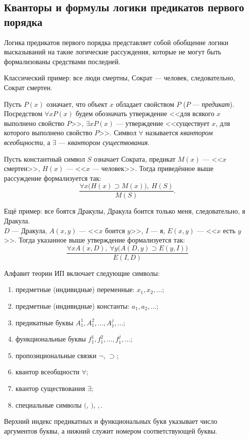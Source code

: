\subsection{Кванторы и формулы логики предикатов первого порядка}
Логика предикатов первого порядка представляет собой обобщение логики высказываний на такие логические рассуждения, которые не могут быть формализованы средствами последней.

Классический пример: все люди смертны, Сократ --- человек, следовательно, Сократ смертен.

Пусть $P(x)$ означает, что объект $x$ обладает свойством $P$ ($P$ --- \textit{предикат}). Посредством $\forall xP(x)$ будем обозначать утверждение <<для всякого $x$ выполнено свойство $P$>>, $\exists xP(x)$ --- утверждение <<существует $x$, для которого выполнено свойство $P$>>. Символ $\forall$ называется \textit{квантором всеобщности}, а $\exists$ --- \textit{квантором существования}.

Пусть константный символ $S$ означает Сократа, предикат $M(x)$ --- <<$x$ смертен>>, $H(x)$ --- <<$x$ --- человек>>. Тогда приведённое выше рассуждение формализуется так:
\[
    \frac{\forall x\big(H(x) \supset M(x)\big),\ H(S)}{M(S)}.
\]

Ещё пример: все боятся Дракулы, Дракула боится только меня, следовательно, я Дракула. \\
$D$ --- Дракула, $A(x, y)$ --- <<$x$ боится $y$>>, $I$ --- я, $E(x, y)$ --- <<$x$ есть $y$>>. Тогда указанное выше утверждение формализуется так:
\[
    \frac{\forall xA(x, D),\ \forall y\big(A(D, y) \supset E(y, I)\big)}{E(I, D)}
\]

Алфавит теории ИП включает следующие символы:
\begin{enumerate}
    \item предметные (индивидные) переменные: $x_1, x_2, \dots$;
    \item предметные (индивидные) константы: $a_1, a_2, \dots$;
    \item предикатные буквы $A_1^1, A_1^2, \dots, A_1^j, \dots$;
    \item функциональные буквы $f_1^1, f_1^2, \dots, f_1^j, \dots$;
    \item пропозициональные связки $\neg$, $\supset$;
    \item квантор всеобщности $\forall$;
    \item квантор существования $\exists$;
    \item специальные символы $($, $)$, $,$.
\end{enumerate}
Верхний индекс предикатных и функциональных букв указывает число аргументов буквы, а нижний служит номером соответствующей буквы.

